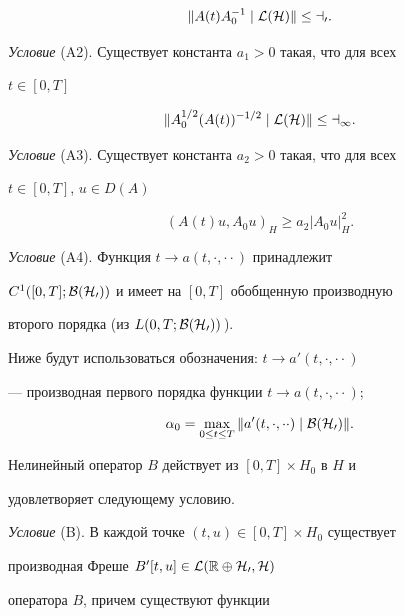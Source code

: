 $$


\|A(t)A^{-1}_0\mid\cal L(H)\|\le a_0. 


$$


 


{\it Условие} (A2). Существует константа $a_1>0$ такая, что для всех 


$t\in[0,T]$


$$


\|A^{1/2}_0(A(t))^{-1/2}\mid\cal L(H)\|\le a_1. 


$$


 


{\it Условие} (A3). Существует константа $a_2>0$ такая, что для всех 


$t\in[0,T]$, $u\in D(A)$


$$


(A(t)u,A_0u)_H\ge a_2|A_0u|^2_H. 


$$


 


{\it Условие} (A4). Функция $t\to a(t,\cdot,\cdot{}\cdot)$ принадлежит 


$C^1([0,T];\cal B(H_0))$ и имеет на $[0,T]$ обобщенную производную 


второго порядка (из $L(0,T;\cal B(H_0))$\,). 


 


Ниже будут использоваться обозначения: $t\to a'(t,\cdot,\cdot{}\cdot)$ 


--- производная первого порядка функции $t\to a(t,\cdot,\cdot{}\cdot)$; 


$$ 


\alpha_0=\max_{0\le t\le T}\|a'(t,\cdot,\cdot{}\cdot)\mid 


\cal B(H_0)\|. 


$$ 


 


Нелинейный оператор $B$ действует из $[0,T]\times H_0$ в $H$ и 


удовлетворяет следующему условию. 


 


{\it Условие} (B). В каждой точке $(t,u)\in[0,T]\times H_0$ существует 


производная Фреше $B'[t,u]\in\cal L(\Bbb R\oplus H_0,H)$ 


оператора $B$, причем существуют функции 


